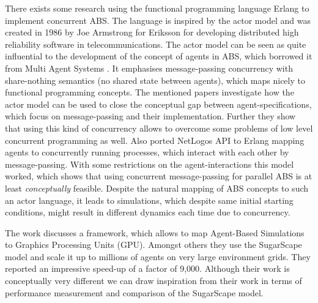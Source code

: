 There exists some research \cite{di_stefano_using_2005, varela_modelling_2004, sher_agent-based_2013} using the functional programming language Erlang \cite{armstrong_erlang_2010} to implement concurrent ABS. The language is inspired by the actor model \cite{agha_actors:_1986} and was created in 1986 by Joe Armstrong for Eriksson for developing distributed high reliability software in telecommunications. The actor model can be seen as quite influential to the development of the concept of agents in ABS, which borrowed it from Multi Agent Systems \cite{wooldridge_introduction_2009}. It emphasises message-passing concurrency with share-nothing semantics (no shared state between agents), which maps nicely to functional programming concepts. The mentioned papers investigate how the actor model can be used to close the conceptual gap between agent-specifications, which focus on message-passing and their implementation. Further they show that using this kind of concurrency allows to overcome some problems of low level concurrent programming as well.
Also \cite{bezirgiannis_improving_2013} ported NetLogos API to Erlang mapping agents to concurrently running processes, which interact with each other by message-passing. With some restrictions on the agent-interactions this model worked, which shows that using concurrent message-passing for parallel ABS is at least \textit{conceptually} feasible. Despite the natural mapping of ABS concepts to such an actor language, it leads to simulations, which despite same initial starting conditions, might result in different dynamics each time due to concurrency.

The work \cite{lysenko_framework_2008} discusses a framework, which allows to map Agent-Based Simulations to Graphics Processing Units (GPU). Amongst others they use the SugarScape model \cite{epstein_growing_1996} and scale it up to millions of agents on very large environment grids. They reported an impressive speed-up of a factor of 9,000. Although their work is conceptually very different we can draw inspiration from their work in terms of performance measurement and comparison of the SugarScape model.



